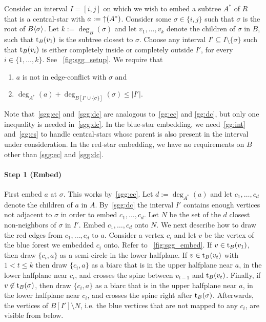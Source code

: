 \documentclass[11pt,a4paper,colorlinks=true,urlcolor=blue,citecolor=red]{article}
\theoremstyle{plain}
\newcommand{\subsubparagraph}[1]{\paragraph{#1}}
\begin{document}
Consider an interval $I=[i,j]$ on which we wish to embed a subtree $A^*$
of $R$ that is a central-star with $a:=\mathop{\uparrow}(A^*)$. Consider some $\sigma\in\{i,j\}$
such that $\sigma$ is the root of $B\langle{\sigma}\rangle$.  Let
$k:=\deg_{B}(\sigma)$ and let $v_1,\dots,v_k$ denote the children of
$\sigma$ in $B$, such that $\mathrm t_B(v_1)$ is the subtree closest to
$\sigma$.  Choose any interval $I'\subseteq I\setminus\{\sigma\}$ such
that $\mathrm t_B(v_i)$ is either completely inside or completely outside
$I'$, for every $i\in\{1,\ldots,k\}$. See
\figurename~\ref{fig:sgg_setup}. We require that
\begin{enumerate}[label={(RS\arabic*)}]\setlength{\itemindent}{3em}
\item\label{sgg:ec} $a$ is not in edge-conflict with $\sigma$ and
\item\label{sgg:dc} $\deg_{A^*}(a)+\deg_{B[I'\cup\{\sigma\}]}(\sigma)\le|I'|$.
\end{enumerate}
Note that~\ref{sgg:ec} and~\ref{sgg:dc} are analogous to~\ref{gg:ec} and
\ref{gg:dc}, but only one inequality is needed in~\ref{sgg:dc}. In the
blue-star embedding, we need~\ref{gg:int} and~\ref{gg:cs} to handle
central-stars whose parent is also present in the interval under
consideration. In the red-star embedding, we have no requirements on $B$
other than \ref{sgg:ec} and \ref{sgg:dc}.

\subsubparagraph{Step 1 (Embed)} First embed $a$ at $\sigma$. This works
by~\ref{sgg:ec}. Let $d:=\deg_{A^*}(a)$ and let $c_1,\dots,c_d$ denote
the children of $a$ in $A$. By~\ref{sgg:dc} the interval $I'$ contains
enough vertices not adjacent to $\sigma$ in order to embed
$c_1,\dots,c_d$. Let $N$ be the set of the $d$ closest non-neighbors of
$\sigma$ in $I'$. Embed $c_1,\dots,c_d$ onto $N$. We next describe how
to draw the red edges from $c_1,\dots,c_d$ to $a$. Consider a vertex
$c_i$ and let $v$ be the vertex of the blue forest we embedded $c_i$
onto.  Refer to \figurename~\ref{fig:sgg_embed}. If $v\in\mathrm t_B(v_1)$,
then draw $\{c_i,a\}$ as a semi-circle in the lower halfplane. If
$v\in\mathrm t_B(v_t)$ with $1<t\leq k$ then draw $\{c_i,a\}$ as a biarc that
is in the upper halfplane near $a$, in the lower halfplane near $c_i$,
and crosses the spine between $v_{t-1}$ and $\mathrm t_B(v_t)$.  Finally, if
$v\not\in\mathrm t_B(\sigma)$, then draw $\{c_i,a\}$ as a biarc that is in the
upper halfplane near $a$, in the lower halfplane near $c_i$, and crosses
the spine right after $\mathrm t_B(\sigma)$. Afterwards, the vertices of
$B[I']\setminus N$, i.e. the blue vertices that are not mapped to any
$c_i$, are visible from below.
\end{document}
